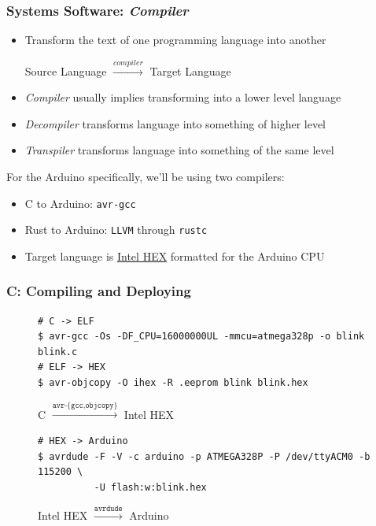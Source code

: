 \documentclass{beamer} \usetheme{Madrid}
\begin{document}
\begin{frame}
    \frametitle{Systems Software: \emph{Compiler}}
    \vfill
    \begin{itemize}
        \item Transform the text of one programming language into another
            \begin{center}
                Source Language $\xrightarrow{compiler}$ Target Language
            \end{center}
        \item \emph{Compiler} usually implies transforming into a lower level language
        \item \emph{Decompiler} transforms language into something of higher level
        \item \emph{Transpiler} transforms language into something of the same level
    \end{itemize}
    \vfill
    For the Arduino specifically, we'll be using two compilers:
    \begin{itemize}
        \item C to Arduino: \texttt{avr-gcc}
        \item Rust to Arduino: \texttt{LLVM} through \texttt{rustc}
        \item Target language is \href{https://en.wikipedia.org/wiki/Intel_HEX}{Intel HEX} formatted for the Arduino CPU
    \end{itemize}
    \vfill
\end{frame}

\begin{frame}[fragile]
    \frametitle{C: Compiling and Deploying}
    \vfill
    \begin{figure}
        \begin{verbatim}
# C -> ELF
$ avr-gcc -Os -DF_CPU=16000000UL -mmcu=atmega328p -o blink blink.c
# ELF -> HEX
$ avr-objcopy -O ihex -R .eeprom blink blink.hex
        \end{verbatim}
        \caption{C $\xrightarrow{\texttt{avr-\{gcc,objcopy\}}}$ Intel HEX}
    \end{figure}
    \vfill
    \begin{figure}
        \begin{verbatim}
# HEX -> Arduino
$ avrdude -F -V -c arduino -p ATMEGA328P -P /dev/ttyACM0 -b 115200 \
          -U flash:w:blink.hex
        \end{verbatim}
        \caption{Intel HEX $\xrightarrow{\texttt{avrdude}}$ Arduino}
    \end{figure}
    \vfill
\end{frame}
\end{document}
